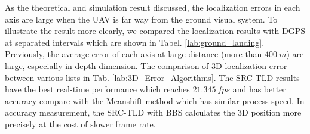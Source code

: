 \begin{table}[!th]
	\centering
	\caption{Eight Experiment Results in Different Weather Condition}
	\label{lab:eight_ground_landing}
\end{table}

As the theoretical and simulation result discussed, the localization errors in each axis are large when the UAV is far way from the ground visual system. To illustrate the result more clearly, we compared the localization results with DGPS at separated intervals which are shown in Tabel. \ref{lab:ground_landing}. Previously, the average error of each axis at large distance (more than $400\ m$) are large, especially in depth dimension. The comparison of 3D localization error between various lists in Tab. \ref{lab:3D_Error_Algorithms}. The SRC-TLD results have the best real-time performance which reaches $21.345\ fps$ and has better accuracy compare with the Meanshift method which has similar process speed. In accuracy measurement, the SRC-TLD with BBS calculates the 3D position more precisely at the cost of slower frame rate.


